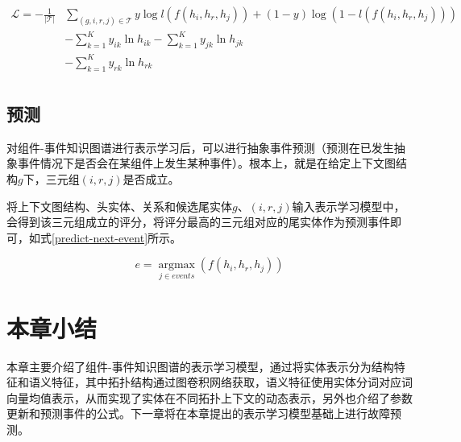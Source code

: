 \begin{equation}
    \begin{aligned}
    \mathcal{L}=-\frac{1}{|\mathcal{T}|}&  \sum_{(g, i, r, j) \in \mathcal{T}} y \log l(f(h_i, h_r, h_j))+(1-y) \log (1-l(f(h_i, h_r, h_j)))\\
    &- \sum_{k=1}^{K} y_{i k} \ln h_{i k} - \sum_{k=1}^{K} y_{j k} \ln h_{j k}\\
    &- \sum_{k=1}^{K} y_{r k} \ln h_{r k}\\
    \end{aligned}
    \label{represent-loss-all}
\end{equation}

\subsection{预测}
对组件-事件知识图谱进行表示学习后，可以进行抽象事件预测（预测在已发生抽象事件情况下是否会在某组件上发生某种事件）。根本上，就是在给定上下文图结构$g$下，三元组$(i, r, j)$是否成立。

将上下文图结构、头实体、关系和候选尾实体$g$、$(i, r, j)$输入表示学习模型中，会得到该三元组成立的评分，将评分最高的三元组对应的尾实体作为预测事件即可，如式\ref{predict-next-event}所示。

\begin{equation}
    e = \mathop{\arg\max}\limits_{j\in events}( f (h_i, h_r, h_j)) 
    \label{predict-next-event}   
\end{equation}


\section{本章小结}
本章主要介绍了组件-事件知识图谱的表示学习模型，通过将实体表示分为结构特征和语义特征，其中拓扑结构通过图卷积网络获取，语义特征使用实体分词对应词向量均值表示，从而实现了实体在不同拓扑上下文的动态表示，另外也介绍了参数更新和预测事件的公式。下一章将在本章提出的表示学习模型基础上进行故障预测。





